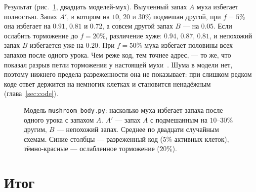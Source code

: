 Результат (рис.~\ref{fig:mbmodel}, двадцать моделей-мух). Выученный запах $A$ муха избегает полностью. Запах $A'$, в котором на $10$, $20$ и $30\%$ подмешан другой, при $f=5\%$ она избегает на $0.91$, $0.81$ и $0.72$, а совсем другой запах $B$ --- на $0.05$. Если ослабить торможение до $f=20\%$, различение хуже: $0.94$, $0.87$, $0.81$, и непохожий запах $B$ избегается уже на $0.20$. При $f=50\%$ муха избегает половины всех запахов после одного урока. Чем реже код, тем точнее адрес, --- то же, что показал разрыв петли торможения у настоящей мухи~\cite{Lin2014}. Шума в модели нет, поэтому нижнего предела разреженности она не показывает: при слишком редком коде ответ держится на немногих клетках и становится ненадёжным (глава~\ref{sec:code}).

\begin{figure}[t]
\centering
{}
\caption{Модель \texttt{mushroom\_body.py}: насколько муха избегает запаха после одного урока с запахом $A$. $A'$ --- запах $A$ с подмешанным на $10$--$30\%$ другим, $B$ --- непохожий запах. Среднее по двадцати случайным схемам. Синие столбцы --- разреженный код ($5\%$ активных клеток), тёмно-красные --- ослабленное торможение ($20\%$).}
\label{fig:mbmodel}
\end{figure}

\section{Итог}

